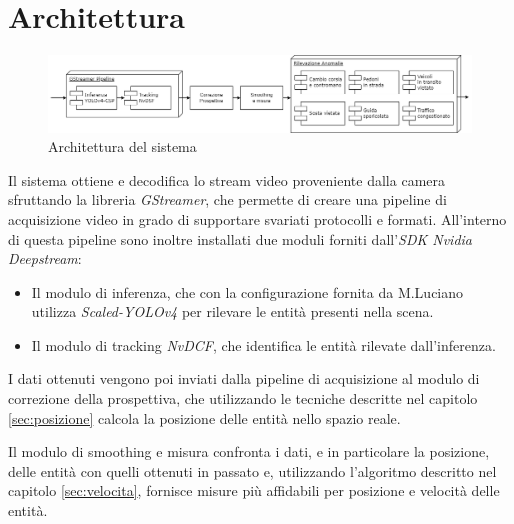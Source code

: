 \chapter{Architettura}
\label{sec:architettura}

\begin{figure}
    \centering
    \includegraphics[width=\textwidth]{images/arch.png}
    \caption{Architettura del sistema}
\end{figure}

Il sistema ottiene e decodifica lo stream video proveniente dalla camera sfruttando la libreria \emph{GStreamer}\cite{arch:gstreamer}, che permette di creare una pipeline di acquisizione video in grado di supportare svariati protocolli e formati. 
All'interno di questa pipeline sono inoltre installati due moduli forniti dall'\emph{SDK Nvidia Deepstream}\cite{arch:deepstream}:
\begin{itemize}
    \item Il modulo di inferenza, che con la configurazione fornita da M.Luciano \cite{marcosluciano} utilizza \emph{Scaled-YOLOv4}\cite{yolocsp} per rilevare le entità presenti nella scena.
    \item Il modulo di tracking \emph{NvDCF}\cite{nvdcf}, che identifica le entità rilevate dall'inferenza.
\end{itemize}

I dati ottenuti vengono poi inviati dalla pipeline di acquisizione al modulo di correzione della prospettiva, che utilizzando le tecniche descritte nel capitolo \ref{sec:posizione} calcola la posizione delle entità nello spazio reale.

Il modulo di smoothing e misura confronta i dati, e in particolare la posizione, delle entità con quelli ottenuti in passato e, utilizzando l'algoritmo descritto nel capitolo \ref{sec:velocita}, fornisce misure più affidabili per posizione e velocità delle entità.

